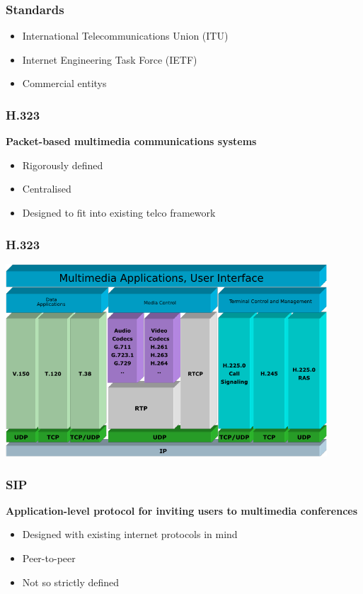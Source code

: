 \begin{frame}
\frametitle{Standards}

		\begin{itemize}
			\item International Telecommunications Union (ITU)
		
			\item Internet Engineering Task Force (IETF)

			\item Commercial entitys
		\end{itemize}

\end{frame}


\begin{frame}
\frametitle{H.323}

	\textbf{Packet-based multimedia communications systems}
	\newline
	\begin{itemize}		
		\item Rigorously defined
		\item Centralised
		\item Designed to fit into existing telco framework
	\end{itemize}

\end{frame}

\begin{frame}
\frametitle{H.323}

	\begin{center} 
  		\includegraphics[width=0.9\textwidth]{h323_protocol_overview.png} 
	\end{center} 

\end{frame}

\begin{frame}
\frametitle{SIP}
\textbf{Application-level protocol for inviting users to multimedia conferences}
	\newline
	\begin{itemize}		
		\item Designed with existing internet protocols in mind
		\item Peer-to-peer
		\item Not so strictly defined
	\end{itemize}

\end{frame}


